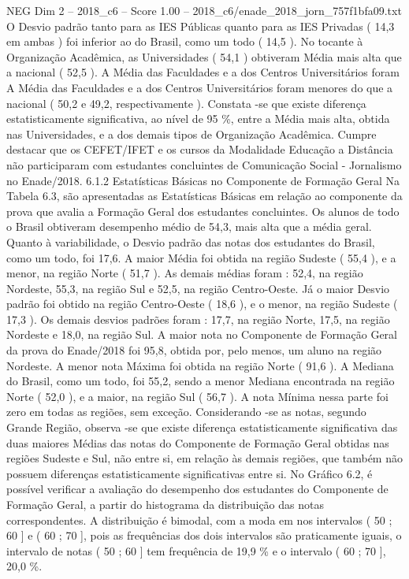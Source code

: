 \begin{textsample}{NEG Dim 2 – 2018\_c6 – Score 1.00 – 2018\_c6/enade\_2018\_jorn\_757f1bfa09.txt}
O Desvio padrão tanto para as IES Públicas quanto para as IES Privadas ( 14,3 em ambas ) foi inferior ao do Brasil, como um todo ( 14,5 ).
No tocante à Organização Acadêmica, as Universidades ( 54,1 ) obtiveram Média mais alta que a nacional ( 52,5 ).
A Média das Faculdades e a dos Centros Universitários foram A Média das Faculdades e a dos Centros Universitários foram menores do que a nacional ( 50,2 e 49,2, respectivamente ).
Constata -se que existe diferença estatisticamente significativa, ao nível de 95 \%, entre a Média mais alta, obtida nas Universidades, e a dos demais tipos de Organização Acadêmica.
Cumpre destacar que os CEFET/IFET e os cursos da Modalidade Educação a Distância não participaram com estudantes concluintes de Comunicação Social - Jornalismo no Enade/2018. 6.1.2 Estatísticas Básicas no Componente de Formação Geral Na Tabela 6.3, são apresentadas as Estatísticas Básicas em relação ao componente da prova que avalia a Formação Geral dos estudantes concluintes.
Os alunos de todo o Brasil obtiveram desempenho médio de 54,3, mais alta que a média geral.
Quanto à variabilidade, o Desvio padrão das notas dos estudantes do Brasil, como um todo, foi 17,6.
A maior Média foi obtida na região Sudeste ( 55,4 ), e a menor, na região Norte ( 51,7 ).
As demais médias foram : 52,4, na região Nordeste, 55,3, na região Sul e 52,5, na região Centro-Oeste.
Já o maior Desvio padrão foi obtido na região Centro-Oeste ( 18,6 ), e o menor, na região Sudeste ( 17,3 ).
Os demais desvios padrões foram : 17,7, na região Norte, 17,5, na região Nordeste e 18,0, na região Sul.
A maior nota no Componente de Formação Geral da prova do Enade/2018 foi 95,8, obtida por, pelo menos, um aluno na região Nordeste.
A menor nota Máxima foi obtida na região Norte ( 91,6 ).
A Mediana do Brasil, como um todo, foi 55,2, sendo a menor Mediana encontrada na região Norte ( 52,0 ), e a maior, na região Sul ( 56,7 ).
A nota Mínima nessa parte foi zero em todas as regiões, sem exceção.
Considerando -se as notas, segundo Grande Região, observa -se que existe diferença estatisticamente significativa das duas maiores Médias das notas do Componente de Formação Geral obtidas nas regiões Sudeste e Sul, não entre si, em relação às demais regiões, que também não possuem diferenças estatisticamente significativas entre si.
No Gráfico 6.2, é possível verificar a avaliação do desempenho dos estudantes do Componente de Formação Geral, a partir do histograma da distribuição das notas correspondentes.
A distribuição é bimodal, com a moda em nos intervalos ( 50 ; 60 ] e ( 60 ; 70 ], pois as frequências dos dois intervalos são praticamente iguais, o intervalo de notas ( 50 ; 60 ] tem frequência de 19,9 \% e o intervalo ( 60 ; 70 ], 20,0 \%.

\end{textsample}
